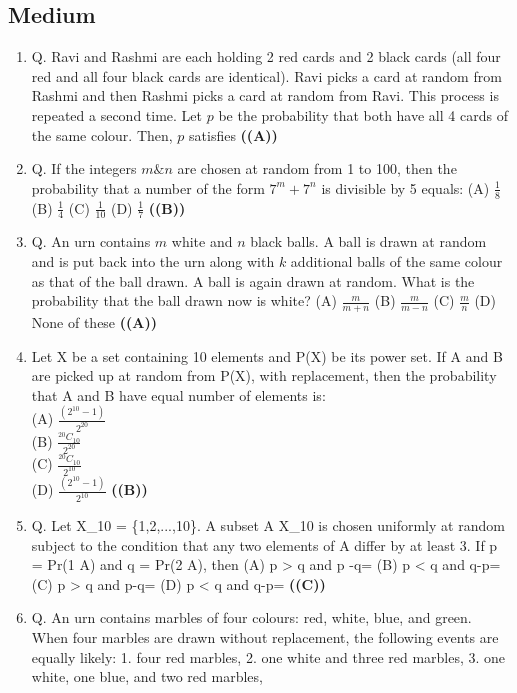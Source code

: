 \documentclass{article}
\begin{document}
\subsection{Medium}
\begin{enumerate}
\item Q. Ravi and Rashmi are each holding 2 red cards and 2 black cards (all four red and all four black cards are identical). Ravi picks a card at random from Rashmi and then Rashmi picks a card at random from Ravi. This process is repeated a second time. Let $p$ be the probability that both have all 4 cards of the same colour. Then, $p$ satisfies \hfill \textbf{((A))}
\item Q. If the integers $m\&n$ are chosen at random from 1 to 100, then the probability that a
number of the form $7^m + 7^n$ is divisible by 5 equals:
(A) $\frac{1}{8}$
(B) $\frac{1}{4}$
(C) $\frac{1}{10}$
(D) $\frac{1}{7}$ \hfill \textbf{((B))}
\item Q. An urn contains $m$ white and $n$ black balls. A ball is drawn at random and is put back into the urn along with $k$ additional balls of the same colour as that of the ball drawn. A ball is again drawn at random. What is the probability that the ball drawn now is white?
(A) $\frac{m}{m+n}$
(B) $\frac{m}{m-n}$
(C) $\frac{m}{n}$
(D) None of these \hfill \textbf{((A))}
\item Let X be a set containing 10 elements and P(X) be its power set. If A and B are picked up at random from P(X), with replacement, then the probability that A and B have equal number of elements is:\\
(A) $\frac{(2^{10}-1)}{2^{20}}$\\
(B) $\frac{{}^{20}C_{10}}{2^{20}}$\\
(C) $\frac{{}^{20}C_{10}}{2^{10}}$\\
(D) $\frac{(2^{10}-1)}{2^{10}}$ \hfill \textbf{((B))}
\item Q. Let X_{10} = \{1,2,...,10\}. A subset A \subseteq X_{10} is chosen uniformly at random subject
to the condition that any two elements of A differ by at least 3. If p = Pr(1 \in A) and
q = Pr(2 \in A), then
(A) p > q and p -q= 
(B) p < q and q-p= 
(C) p > q and p-q= 
(D) p < q and q-p=  \hfill \textbf{((C))}
\item Q. An urn contains marbles of four colours: red, white, blue, and green. When four marbles
are drawn without replacement, the following events are equally likely:
1. four red marbles,
2. one white and three red marbles,
3. one white, one blue, and two red marbles,

\end{enumerate}
\end{document}
